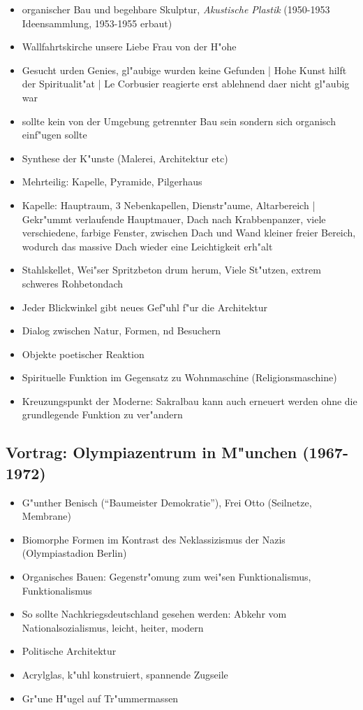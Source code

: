 \documentclass[emulatestandardclasses]{scrartcl}
\begin{document}
\begin{itemize}
  \item organischer Bau und begehbare Skulptur, \emph{Akustische Plastik} (1950-1953 Ideensammlung, 1953-1955 erbaut)
  \item Wallfahrtskirche unsere Liebe Frau von der H"ohe
  \item Gesucht urden Genies, gl"aubige wurden keine Gefunden | Hohe Kunst hilft der Spiritualit"at | Le Corbusier reagierte erst ablehnend daer nicht gl"aubig war
  \item sollte kein von der Umgebung getrennter Bau sein sondern sich organisch einf"ugen sollte
  \item Synthese der K"unste (Malerei, Architektur etc)
  \item Mehrteilig: Kapelle, Pyramide, Pilgerhaus
  \item Kapelle: Hauptraum, 3 Nebenkapellen, Dienstr"aume, Altarbereich | Gekr"ummt verlaufende Hauptmauer, Dach nach Krabbenpanzer, viele verschiedene, farbige Fenster, zwischen Dach und Wand kleiner freier Bereich, wodurch das massive Dach wieder eine Leichtigkeit erh"alt
  \item Stahlskellet, Wei"ser Spritzbeton drum herum, Viele St"utzen, extrem schweres Rohbetondach
  \item Jeder Blickwinkel gibt neues Gef"uhl f"ur die Architektur
  \item Dialog zwischen Natur, Formen, nd Besuchern
  \item Objekte poetischer Reaktion
  \item Spirituelle Funktion im Gegensatz zu Wohnmaschine (Religionsmaschine)
  \item Kreuzungspunkt der Moderne: Sakralbau kann auch erneuert werden ohne die grundlegende Funktion zu ver"andern
\end{itemize}


\subsection{Vortrag: Olympiazentrum in M"unchen (1967-1972)}

\begin{itemize}
  \item G"unther Benisch ("`Baumeister Demokratie"'), Frei Otto (Seilnetze, Membrane)
  \item Biomorphe Formen im Kontrast des Neklassizismus der Nazis (Olympiastadion Berlin)
  \item Organisches Bauen: Gegenstr"omung zum wei"sen Funktionalismus, Funktionalismus
  \item So sollte Nachkriegsdeutschland gesehen werden: Abkehr vom Nationalsozialismus, leicht, heiter, modern
  \item Politische Architektur
  \item Acrylglas, k"uhl konstruiert, spannende Zugseile
  \item Gr"une H"ugel auf Tr"ummermassen
\end{itemize}
\end{document}

